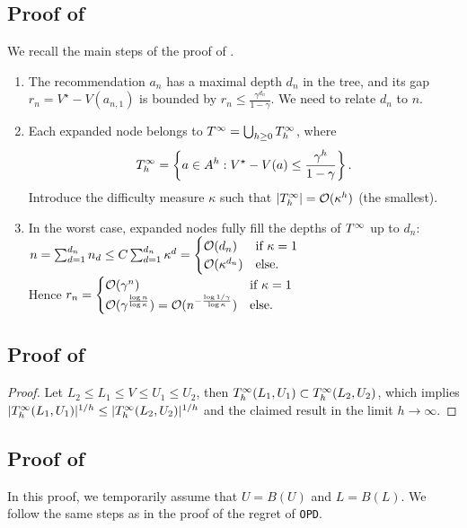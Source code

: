 \documentclass[runningheads]{llncs}
\begin{document}
\subsection{Proof of }
We recall the main steps of the proof of \citet{Hren2008optimistic}.\\

\begin{enumerate}
	\item The recommendation $a_n$ has a maximal depth $d_n$ in the tree, and its gap $r_n = V^\star - V({a_{n,1}})$ is bounded by $r_n \leq \frac{\gamma^{d_n}}{1-\gamma}$. We need to relate $d_n$ to $n$.
	
	\item Each expanded node belongs to $T^\infty = \bigcup_{h\geq 0} T_h^\infty$, where $$T_h^\infty = \left\{a\in A^h: V^\star-V(a) \leq \frac{\gamma^h}{1-\gamma}\right\}.$$ Introduce the difficulty measure $\kappa$ such that $|T_h^\infty| = \mathcal{O}(\kappa^h)$ (the smallest).
	
	\item In the worst case, expanded nodes fully fill the depths of $T^\infty$ up to $d_n$: $n = \sum_{d=1}^{d_n} n_d \leq  C\sum_{d=1}^{d_n} \kappa^d = \begin{cases}
	\mathcal{O}(d_n) &\text{if $\kappa=1$}\\
	\mathcal{O}(\kappa^{d_n}) &\text{else.}
	\end{cases}$\\
	Hence $r_n = \begin{cases}
	\mathcal{O}(\gamma^n) &\text{if $\kappa=1$}\\
	\mathcal{O}(\gamma^{\frac{\log n}{\log \kappa}}) = \mathcal{O}(n^{-\frac{\log 1/\gamma}{\log \kappa}}) &\text{else.}
	\end{cases}$
\end{enumerate}

\subsection{Proof of }

\begin{proof}
Let $L_2\leq L_1\leq V\leq U_1\leq U_2$, then $T_h^\infty(L_1,U_1) \subset T_h^\infty(L_2,U_2)$, which implies $|T_h^\infty(L_1,U_1)|^{1/h} \leq |T_h^\infty(L_2,U_2)|^{1/h}$ and the claimed result in the limit $h\rightarrow\infty$.
\end{proof}

\subsection{Proof of }
In this proof, we temporarily assume that $U=B(U)$ and $L=B(L)$. We follow the same steps as in the proof of the regret of \texttt{OPD}.
\end{document}
